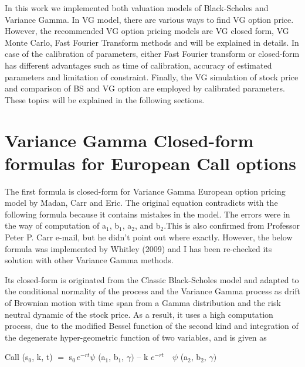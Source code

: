 In this work we implemented both valuation models of Black-Scholes and 
Variance Gamma. In VG model, there are various ways to find VG option price. 
However, the recommended VG option pricing models are VG closed form, VG 
Monte Carlo, Fast Fourier Transform methods and will be explained in 
details. In case of the calibration of parameters, either Fast Fourier 
transform or closed-form has different advantages such as time of 
calibration, accuracy of estimated parameters and limitation of constraint. 
Finally, the VG simulation of stock price and comparison of BS and VG option 
are employed by calibrated parameters. These topics will be explained in the 
following sections.

\section[Closed-form formulas for European Call options]
        {Variance Gamma Closed-form formulas for European Call options}

The first formula is closed-form for Variance Gamma European option pricing 
model by Madan, Carr and Eric. The original equation contradicts with the 
following formula because it contains mistakes in the model. The errors were 
in the way of computation of a$_{1}$, b$_{1}$, a$_{2}$, and b$_{2}$.This is 
also confirmed from Professor Peter P. Carr e-mail, but he didn't point out 
where exactly. However, the below formula was implemented by Whitley (2009) 
and I has been re-checked its solution with other Variance Gamma methods.

Its closed-form is originated from the Classic Black-Scholes model and 
adapted to the conditional normality of the process and the Variance Gamma 
process as drift of Brownian motion with time span from a Gamma distribution 
and the risk neutral dynamic of the stock price. As a result, it uses a high 
computation process, due to the modified Bessel function of the second kind 
and integration of the degenerate hyper-geometric function of two variables, 
and is given as

\begin{center}
Call (s$_{0}$, k, t) $=$ s$_{0\, }e^{-rt}\psi $ (a$_{1}$, b$_{1}$, 
$\gamma )$ -- k $e^{-rt} \quad \psi $ (a$_{2}$, b$_{2}$, $\gamma )$
\end{center}

